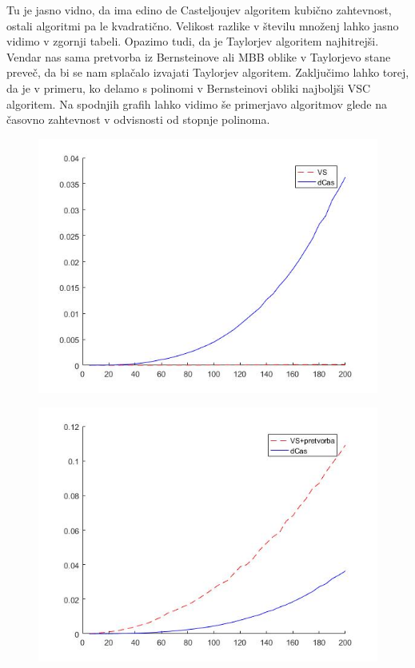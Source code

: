 \documentclass{article}
\begin{document}
Tu je jasno vidno, da ima edino de Casteljoujev algoritem kubično zahtevnost, ostali algoritmi pa le kvadratično. Velikost razlike v številu množenj lahko jasno vidimo v zgornji tabeli. Opazimo tudi, da je Taylorjev algoritem najhitrejši. Vendar nas sama pretvorba iz Bernsteinove ali MBB oblike v Taylorjevo stane preveč, da bi se nam splačalo izvajati Taylorjev algoritem. Zaključimo lahko torej, da je v primeru, ko delamo s polinomi v Bernsteinovi obliki najboljši VSC algoritem.
Na spodnjih grafih lahko vidimo še primerjavo algoritmov glede na časovno zahtevnost v odvisnosti od stopnje polinoma.
\begin{figure}[h]
\centering
\begin{minipage}{.5\textwidth}
\centering
\includegraphics[scale=0.3]{vs}
\label{fig:vs}
\end{minipage}%
\begin{minipage}{.5\textwidth}
\centering
\includegraphics[scale=0.3]{vs_potratn.jpg}
\label{fig:vspot}
\end{minipage}
\end{figure}
\end{document}
